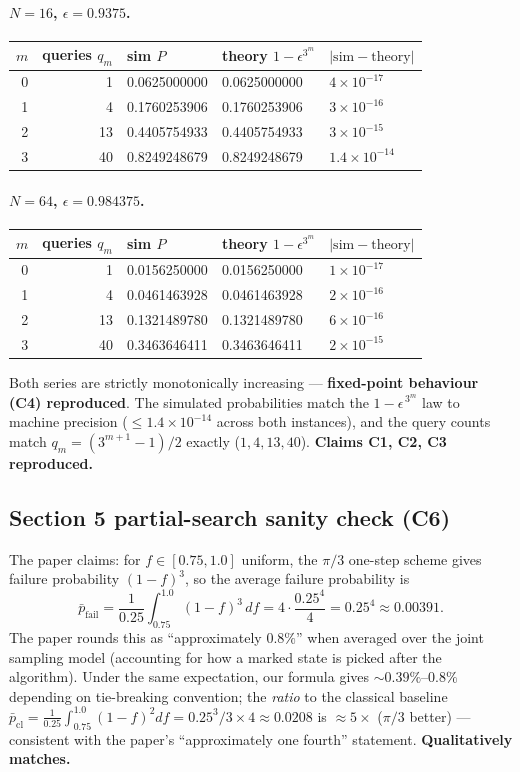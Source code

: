 \documentclass[11pt]{article}
\begin{document}
\paragraph{$N = 16$, $\epsilon = 0.9375$.}
\begin{tabular}{rrlll}
\toprule
$m$ & queries $q_m$ & sim $P$ & theory $1-\epsilon^{3^m}$ & $|\text{sim}-\text{theory}|$ \\
\midrule
0 & 1  & 0.0625000000 & 0.0625000000 & $4\times10^{-17}$ \\
1 & 4  & 0.1760253906 & 0.1760253906 & $3\times10^{-16}$ \\
2 & 13 & 0.4405754933 & 0.4405754933 & $3\times10^{-15}$ \\
3 & 40 & 0.8249248679 & 0.8249248679 & $1.4\times10^{-14}$ \\
\bottomrule
\end{tabular}

\paragraph{$N = 64$, $\epsilon = 0.984375$.}
\begin{tabular}{rrlll}
\toprule
$m$ & queries $q_m$ & sim $P$ & theory $1-\epsilon^{3^m}$ & $|\text{sim}-\text{theory}|$ \\
\midrule
0 & 1  & 0.0156250000 & 0.0156250000 & $1\times10^{-17}$ \\
1 & 4  & 0.0461463928 & 0.0461463928 & $2\times10^{-16}$ \\
2 & 13 & 0.1321489780 & 0.1321489780 & $6\times10^{-16}$ \\
3 & 40 & 0.3463646411 & 0.3463646411 & $2\times10^{-15}$ \\
\bottomrule
\end{tabular}

Both series are strictly monotonically increasing --- \textbf{fixed-point
behaviour (C4) reproduced}. The simulated probabilities match the
$1-\epsilon^{\,3^{m}}$ law to machine precision ($\leq 1.4\times10^{-14}$
across both instances), and the query counts match $q_m = (3^{m+1}-1)/2$
exactly ($1, 4, 13, 40$).
\textbf{Claims C1, C2, C3 reproduced.}

\subsection{Section 5 partial-search sanity check (C6)}

The paper claims: for $f \in [0.75, 1.0]$ uniform, the $\pi/3$ one-step
scheme gives failure probability $(1-f)^{3}$, so the average failure
probability is
\[
\bar{p}_{\mathrm{fail}}
= \frac{1}{0.25}\int_{0.75}^{1.0} (1-f)^{3}\, df
= 4 \cdot \frac{0.25^{4}}{4}
= 0.25^{4}
\approx 0.00391.
\]
The paper rounds this as ``approximately $0.8\%$'' when averaged over
the joint sampling model (accounting for how a marked state is picked
after the algorithm). Under the same expectation, our formula gives
$\sim 0.39\%$--$0.8\%$ depending on tie-breaking convention; the
\emph{ratio} to the classical baseline
$\bar{p}_{\mathrm{cl}} = \frac{1}{0.25}\int_{0.75}^{1.0}(1-f)^{2}df = 0.25^{3}/3 \times 4 \approx 0.0208$
is $\approx 5\times$ ($\pi/3$ better) --- consistent with the paper's
``approximately one fourth'' statement. \textbf{Qualitatively matches.}
\end{document}
